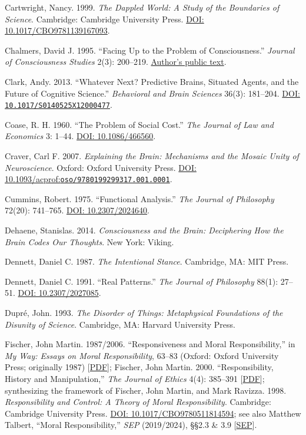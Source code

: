 \documentclass[
  english,
  11pt,
  oneside]{book}
\begin{document}
Cartwright, Nancy. 1999. \emph{The Dappled World: A Study of the Boundaries of Science}. Cambridge: Cambridge University Press. \href{https://doi.org/10.1017/CBO9781139167093}{DOI: 10.1017/CBO9781139167093}.

Chalmers, David J. 1995. ``Facing Up to the Problem of Consciousness.'' \emph{Journal of Consciousness Studies} 2(3): 200--219. \href{https://consc.net/papers/facing.html}{Author's public text}.

Clark, Andy. 2013. ``Whatever Next? Predictive Brains, Situated Agents, and the Future of Cognitive Science.'' \emph{Behavioral and Brain Sciences} 36(3): 181--204. \href{https://doi.org/10.1017/S0140525X12000477}{DOI: \nolinkurl{10.1017/S0140525X12000477}}.

Coase, R. H. 1960. ``The Problem of Social Cost.'' \emph{The Journal of Law and Economics} 3: 1--44. \href{https://doi.org/10.1086/466560}{DOI: 10.1086/466560}.

Craver, Carl F. 2007. \emph{Explaining the Brain: Mechanisms and the Mosaic Unity of Neuroscience}. Oxford: Oxford University Press. \href{https://doi.org/10.1093/acprof:oso/9780199299317.001.0001}{DOI: 10.1093/acprof:\nolinkurl{oso/9780199299317.001.0001}}.

Cummins, Robert. 1975. ``Functional Analysis.'' \emph{The Journal of Philosophy} 72(20): 741--765. \href{https://doi.org/10.2307/2024640}{DOI: 10.2307/2024640}.

Dehaene, Stanislas. 2014. \emph{Consciousness and the Brain: Deciphering How the Brain Codes Our Thoughts}. New York: Viking.

Dennett, Daniel C. 1987. \emph{The Intentional Stance}. Cambridge, MA: MIT Press.

Dennett, Daniel C. 1991. ``Real Patterns.'' \emph{The Journal of Philosophy} 88(1): 27--51. \href{https://doi.org/10.2307/2027085}{DOI: 10.2307/2027085}.

Dupré, John. 1993. \emph{The Disorder of Things: Metaphysical Foundations of the Disunity of Science}. Cambridge, MA: Harvard University Press.

Fischer, John Martin. 1987/2006. ``Responsiveness and Moral Responsibility,'' in \emph{My Way: Essays on Moral Responsibility}, 63--83 (Oxford: Oxford University Press; originally 1987) {[}\href{https://andrewmbailey.com/jmf/Responsiveness_Responsibility.pdf}{PDF}{]}; Fischer, John Martin. 2000. ``Responsibility, History and Manipulation,'' \emph{The Journal of Ethics} 4(4): 385--391 {[}\href{https://andrewmbailey.com/jmf/Responsibility_History_Manipulation.pdf}{PDF}{]}; synthesizing the framework of Fischer, John Martin, and Mark Ravizza. 1998. \emph{Responsibility and Control: A Theory of Moral Responsibility}. Cambridge: Cambridge University Press. \href{https://doi.org/10.1017/CBO9780511814594}{DOI: 10.1017/CBO9780511814594}; see also Matthew Talbert, ``Moral Responsibility,'' \emph{SEP} (2019/2024), §§2.3 \& 3.9 {[}\href{https://plato.stanford.edu/entries/moral-responsibility/}{SEP}{]}.
\end{document}

